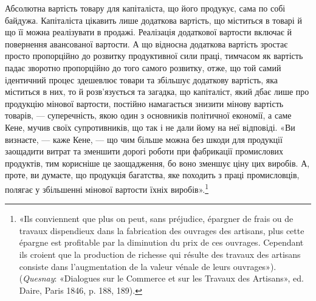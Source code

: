 Абсолютна вартість товару для капіталіста, що його продукує, сама по собі
байдужа. Капіталіста цікавить лише додаткова
вартість, що міститься в товарі й що її можна реалізувати в продажі. Реалізація
додаткової вартости включає й повернення авансованої вартости. А що відносна
додаткова вартість зростає просто пропорційно до розвитку продуктивної сили
праці, тимчасом як вартість падає зворотно пропорційно до того самого розвитку,
отже, що той самий ідентичний процес здешевлює товари та збільшує додаткову
вартість, яка міститься в них, то й розв’язується
та загадка, що капіталіст, який дбає лише про продукцію мінової
вартости, постійно намагається знизити мінову вартість товарів, —
суперечність, якою один з основників політичної економії, а
саме Кене, мучив своїх супротивників, що так і не дали йому на
неї відповіді. «Ви визнаєте, — каже Кене, — що чим більше
можна без шкоди для продукції заощадити витрат та зменшити
дорогі роботи при фабрикації промислових продуктів, тим корисніше
це заощадження, бо воно зменшує ціну цих виробів. А, проте,
ви думаєте, що продукція багатства, яке походить з праці промисловців, полягає у
збільшенні мінової вартости їхніх виробів».\footnote{
«Іls conviennent que plus on peut, sans préjudice, épargner de frais ou
de travaux dispendieux dans la fabrication des ouvrages des artisans, plus
cette épargne est profitable par la diminution du prix de ces ouvrages.
Cependant ils croient que la production de richesse qui résulte des travaux
des artisans consiste dans l’augmentation de la valeur vénale de leurs ouvrages»).
(\emph{Quesnay}: «Dialogues sur le Commerce et sur les Travaux des
Artisans», ed. Daire, Paris 1846, p. 188, 189).
}

